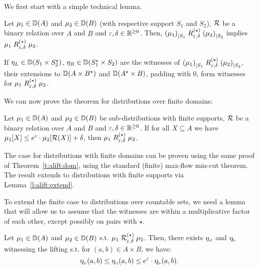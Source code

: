 \documentclass{lmcs}
\begin{document}
We first start with a simple technical lemma.

\begin{lem} \label{l:alift:extend}
  Let $\mu_1 \in {\mathbb{D}}(A)$ and $\mu_2 \in {\mathbb{D}}(B)$ (with respective
  support $S_1$ and $S_2$), $\mathrel{\mathcal{R}}$ be a binary relation over
  $A$ and $B$ and $\varepsilon, \delta \in \mathbb{R}^{\geq 0}$.  Then,
  ${(\mu_1)}_{|{S_1}} \mathrel{R^{(\star)}_{\varepsilon, \delta}} {(\mu_2)}_{|{S_2}}$
  implies
  $\mu_1 \mathrel{R^{(\star)}_{\varepsilon, \delta}} \mu_2$.
\end{lem}

\proofatend
  If $\eta_L \in {\mathbb{D}}(S_1 \times S_2^\star)$,
  $\eta_R \in {\mathbb{D}}(S_1^\star \times S_2)$ are the witnesses of
  ${(\mu_1)}_{|{S_1}} \mathrel{R^{(\star)}_{\varepsilon, \delta}} {(\mu_2)}_{|{S_2}}$,
  their extensions to ${\mathbb{D}}(A \times B^\star)$ and
  ${\mathbb{D}}(A^\star \times B)$, padding with $0$, form witnesses for
  $\mu_1 \mathrel{R^{(\star)}_{\varepsilon, \delta}} \mu_2$.
\endproofatend

We can now prove the theorem for distributions over finite domains:

\begin{lem}
  \label{l:strassen:fin}
  Let $\mu_1 \in {\mathbb{D}}(A)$ and $\mu_2 \in {\mathbb{D}}(B)$ be sub-distributions with
  finite supports, $\mathrel{\mathcal{R}}$ be a binary relation over $A$ and $B$ and
  $\varepsilon, \delta \in \mathbb{R}^{\geq 0}$. If for all $X \subseteq A$ we have $\mu_1[X]
  \leq e^\varepsilon \cdot \mu_2[\mathcal{R}(X)] + \delta$, then $\mu_1
  \mathrel{R^{(\star)}_{\varepsilon, \delta}} \mu_2$.
\end{lem}

\proofatend
  The case for distributions with finite domains can be proven using
  the same proof of Theorem~\ref{t:alift:dom}, using the standard
  (finite) max-flow min-cut theorem. The result extends to
  distributions with finite supports via Lemma~\ref{l:alift:extend}.
\endproofatend

To extend the finite case to distributions over countable sets, we need a lemma
that will allow us to assume that the witnesses are within a multiplicative
factor of each other, except possibly on pairs with $\star$.

\begin{lem} \label{l:witdom}
  Let $\mu_1 \in {\mathbb{D}}(A)$ and $\mu_2 \in {\mathbb{D}}(B)$ s.t.
  $\mu_1 \mathrel{\mathrel{\mathcal{R}}^{(\star)}_{\varepsilon, \delta}} \mu_2$.
  Then, there exists $\eta_{\mspace{-1.5mu}{\scriptscriptstyle \vartriangleleft}}$ and $\eta_{\mspace{-1.5mu}{\scriptscriptstyle \vartriangleright}}$ witnessing the
  lifting s.t. for $(a, b) \in A \times B$, we have:
  \[ \eta_{\mspace{-1.5mu}{\scriptscriptstyle \vartriangleright}}(a, b)
       \leq \eta_{\mspace{-1.5mu}{\scriptscriptstyle \vartriangleleft}}(a, b)
       \leq e^\varepsilon \cdot \eta_{\mspace{-1.5mu}{\scriptscriptstyle \vartriangleright}}(a, b) . \]
\end{lem}
\end{document}
